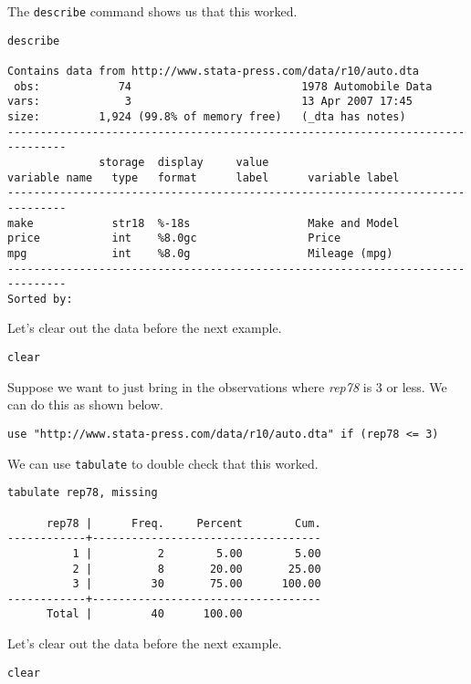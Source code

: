 The \lstinline{describe} command shows us that this worked.

\begin{lstlisting}
describe

Contains data from http://www.stata-press.com/data/r10/auto.dta
 obs:            74                          1978 Automobile Data
vars:             3                          13 Apr 2007 17:45
size:         1,924 (99.8% of memory free)   (_dta has notes)
-------------------------------------------------------------------------------
              storage  display     value
variable name   type   format      label      variable label
-------------------------------------------------------------------------------
make            str18  %-18s                  Make and Model
price           int    %8.0gc                 Price
mpg             int    %8.0g                  Mileage (mpg)
-------------------------------------------------------------------------------
Sorted by:
\end{lstlisting}

Let's clear out the data before the next example.

\begin{lstlisting}
clear
\end{lstlisting}

Suppose we want to just bring in the observations where \textit{rep78} is 3 or less. We can do this as shown below.

\begin{lstlisting}
use "http://www.stata-press.com/data/r10/auto.dta" if (rep78 <= 3)
\end{lstlisting}

We can use \lstinline{tabulate} to double check that this worked.

\begin{lstlisting}
tabulate rep78, missing

      rep78 |      Freq.     Percent        Cum.
------------+-----------------------------------
          1 |          2        5.00        5.00
          2 |          8       20.00       25.00
          3 |         30       75.00      100.00
------------+-----------------------------------
      Total |         40      100.00
\end{lstlisting}

Let's clear out the data before the next example.

\begin{lstlisting}
clear
\end{lstlisting}


